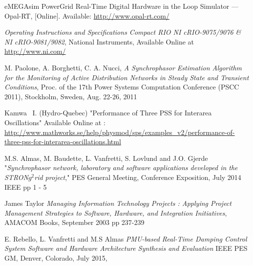 \documentclass[conference]{IEEEtran}
\begin{document}
\begin{thebibliography}{1}
 eMEGAsim PowerGrid Real-Time Digital Hardware in the Loop Simulator — Opal-RT, [Online]. Available: \url{http://www.opal-rt.com/}

 \emph{Operating Instructions and Specifications Compact RIO NI cRIO-9075/9076 \& NI cRIO-9081/9082}, National Instruments, Available Online at \url{http://www.ni.com/}

 M. Paolone, A. Borghetti, C. A. Nucci, \emph{A Synchrophasor Estimation Algorithm for the Monitoring of Active Distribution Networks in Steady State and Transient Conditions}, Proc. of the 17th Power Systems Computation Conference (PSCC 2011), Stockholm, Sweden, Aug. 22-26, 2011 

 Kamwa \ I. (Hydro-Quebec) "Performance of Three PSS for Interarea Oscillations" Available Online at : \url{http://www.mathworks.se/help/physmod/sps/examples_v2/performance-of-three-pss-for-interarea-oscillations.html}



 M.S. Almas, M. Baudette, L. Vanfretti, S. Lovlund and J.O. Gjerde "\emph{Synchrophasor network, laboratory and software applications developed in the STRON$g^{2}$rid project}," PES General Meeting, Conference Exposition, July 2014 IEEE pp 1 - 5

 James Taylor \emph{Managing Information Technology Projects : Applying Project Management Strategies to Software, Hardware, and Integration Initiatives}, AMACOM Books, September 2003 pp 237-239

 E. Rebello, L. Vanfretti and M.S Almas \emph{PMU-based Real-Time Damping Control System Software and Hardware Architecture Synthesis and Evaluation} IEEE PES GM, Denver, Colorado, July 2015,




\end{thebibliography}
\end{document}
